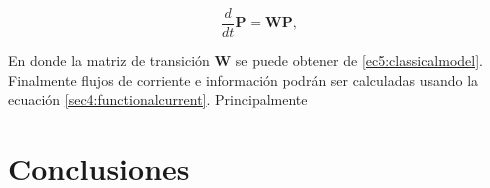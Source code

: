 \begin{equation*}
    \frac{d}{dt}\textbf{P} = \textbf{W}\textbf{P},
\end{equation*}

En donde la matriz de transición $\textbf{W}$ se puede obtener de \ref{ec5:classicalmodel}. Finalmente flujos de corriente e información podrán ser calculadas usando la ecuación \ref{sec4:functionalcurrent}. Principalmente 

\label{sec5:demonio}


\chapter{Conclusiones}






